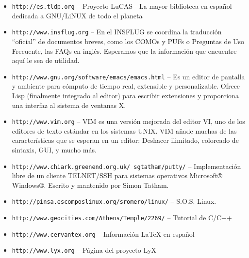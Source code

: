 \begin{itemize}
\item {\tt http://es.tldp.org}  --  Proyecto LuCAS  -  La
  mayor biblioteca en español dedicada a GNU/LiNUX de todo el planeta

\item {\tt http://www.insflug.org}  --  En  el INSFLUG  se  coordina
  la traducción ``oficial'' de documentos  breves, como los COMOs  y
  PUFs o  Preguntas de Uso Frecuente, las FAQs  en inglés. Esperamos
  que la información que encuentre aquí le sea de utilidad.

\item {\tt http://www.gnu.org/software/emacs/emacs.html} --  Es un
  editor de  pantalla y  ambiente  para cómputo  de  tiempo real,
  extensible  y  personalizable.  Ofrece Lisp (finalmente integrado al
  editor)  para escribir  extensiones  y proporciona  una interfaz  al
  sistema de ventanas X.

\item {\tt http://www.vim.org} -- VIM es  una versión mejorada del
  editor VI, uno de los editores de texto estándar en los sistemas UNIX.
  VIM añade muchas de las  características que se  esperan en  un editor:
  Deshacer ilimitado, coloreado de sintaxis, GUI, y mucho más.

\item \label{putty}{\tt http://www.chiark.greenend.org.uk/~sgtatham/putty/} --
  Implementación libre de un cliente TELNET/SSH para sistemas operativos
  Microsoft® Windows®. Escrito y mantenido por Simon Tatham.

\item {\tt http://pinsa.escomposlinux.org/sromero/linux/} -- S.O.S. Linux.

\item  {\tt http://www.geocities.com/Athens/Temple/2269/}  -- Tutorial
de C/C++


\item {\tt http://www.cervantex.org} -- Información LaTeX en español


\item {\tt http://www.lyx.org}  --  Página del proyecto LyX 


\end{itemize}
